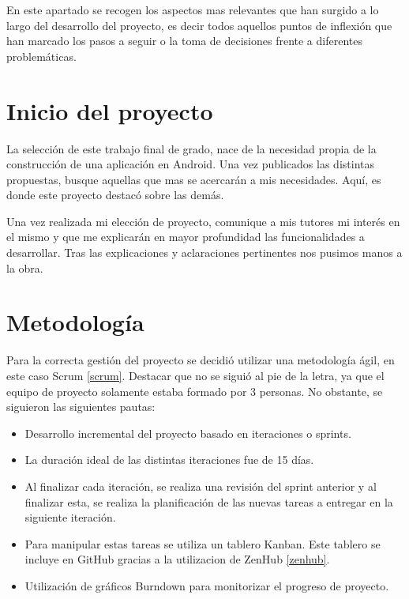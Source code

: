 
En este apartado se recogen los aspectos mas relevantes que han surgido a lo largo del desarrollo del proyecto, es decir todos aquellos puntos de inflexión que han marcado los pasos a seguir o la toma de decisiones frente a diferentes problemáticas.


\section{Inicio del proyecto}

La selección de este trabajo final de grado, nace de la necesidad propia de la construcción de una aplicación en Android. Una vez publicados las distintas propuestas, busque aquellas que mas se acercarán a mis necesidades. Aquí, es donde este proyecto destacó sobre las demás.

Una vez realizada mi elección de proyecto, comunique a mis tutores mi interés en el mismo y que me explicarán en mayor profundidad las funcionalidades a desarrollar. Tras las explicaciones y aclaraciones pertinentes nos pusimos manos a la obra.

\section{Metodología}

Para la correcta gestión del proyecto se decidió utilizar una metodología ágil, en este caso Scrum \ref{scrum}. Destacar que no se siguió al pie de la letra, ya que el equipo de proyecto solamente estaba formado por 3 personas. No obstante, se siguieron las siguientes pautas:

\begin{itemize}

	\item Desarrollo incremental del proyecto basado en iteraciones o sprints.
	
	\item La duración ideal de las distintas iteraciones fue de 15 días.
	
	\item Al finalizar cada iteración, se realiza una revisión del sprint anterior y al finalizar esta, se realiza la planificación de las nuevas tareas a entregar en la siguiente iteración.
	
	\item Para manipular estas tareas se utiliza un tablero Kanban. Este tablero se incluye en GitHub gracias a la utilizacion de ZenHub \ref{zenhub}.
	
	\item Utilización de gráficos Burndown para monitorizar el progreso de proyecto.
	

\end{itemize}
 

